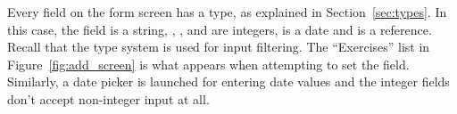 Every field on the form screen has a type, as explained in
Section~\ref{sec:types}. In this case, the  field is a string,
, , and  are integers,
 is a date and  is a reference. Recall that the type
system is used for input filtering. The ``Exercises'' list in
Figure~\ref{fig:add_screen} is what appears when attempting to set the
 field. Similarly, a date picker is launched for entering date
values and the integer fields don't accept non-integer input at all.

%
%
%
%







